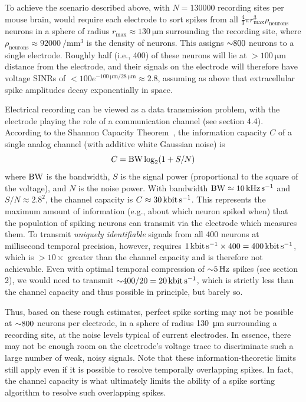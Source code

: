To achieve the scenario described above, with $N=\num{130000}$ recording sites per mouse brain, would require each electrode to sort spikes from all 
$\frac{4}{3} \pi r_{\text{max}}^3 \rho_{\text{neurons}}$ neurons in a sphere of radius $r_{\text{max}} \approx \SI{130}{\micro\meter}$ surrounding the recording site, where $\rho_{\text{neurons}} \approx \SI{92000}{\per\milli\meter\cubed}$ is the density of neurons. This assigns ${\sim} \num{800}$ neurons to a single electrode. Roughly half (i.e., \num{400}) of these neurons will lie at $>\SI{100}{\micro\meter}$ distance from the electrode, and their signals on the electrode will therefore have voltage SINRs of $ < \num{100} e^{-\SI{100}{\micro\meter}/\SI{28}{\micro\meter}} \approx \num{2.8}$, assuming as above that extracellular spike amplitudes decay exponentially in space.
  
Electrical recording can be viewed as a data transmission problem, with the electrode playing the role of a communication channel (see section 4.4). According to the  Shannon Capacity Theorem~\cite{cover06}, the information capacity $C$ of a single analog channel (with additive white Gaussian noise)  is \[C = \text{BW} \log_2 (1 + S/N)\] where $\text{BW}$ is the bandwidth, $S$ is the signal power (proportional to the square of the voltage), and $N$ is the noise power. With bandwidth $\text{BW} \approx \SI{10}{\kilo\hertz\per\second}$ and $S/N \approx \num{2.8}^{\num{2}}$, the channel capacity is $C \approx \SI{30}{\kilo\bit\per\second}$. This represents the maximum amount of information (e.g., about which neuron spiked when) that the population of spiking neurons can transmit via the electrode which measures them. To transmit \emph{uniquely identifiable} signals from all \num{400} neurons at millisecond temporal precision, however, requires $\SI{1}{\kilo\bit\per\second} \times 400 = \SI{400}{\kilo\bit\per\second}$, which is $>\num{10}\times$ greater than the channel capacity and is therefore not achievable.  Even with optimal temporal compression of ${\sim} \SI{5}{\hertz}$ spikes (see section 2), we would need to transmit $\ca 400/20 = \SI{20}{\kilo\bit\per\second}$, which is strictly less than the channel capacity and thus possible in principle, but barely so.  

Thus, based on these rough estimates, perfect spike sorting may not be possible at ${\sim} \num{800}$ neurons per electrode, in a sphere of radius \SI{130}{\micro\meter} surrounding a recording site, at the noise levels typical of current electrodes. In essence, there may not be enough room on the electrode’s voltage trace to discriminate such a large number of weak, noisy signals. Note that these information-theoretic limits still apply even if it is possible to resolve temporally overlapping spikes. In fact, the channel capacity is what ultimately limits the ability of a spike sorting algorithm to resolve such overlapping spikes.

